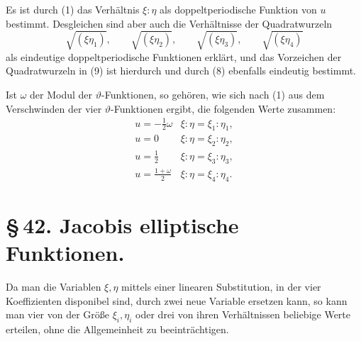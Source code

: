 \documentclass[11pt]{article}
\begin{document}
Es ist durch (1) das Verhältnis $\xi:\eta$ als doppeltperiodische Funktion von $u$ bestimmt. Desgleichen sind aber auch die Verhältnisse der Quadratwurzeln
\begin{equation}
\sqrt{(\xi\eta_1)},\qquad \sqrt{(\xi\eta_2)},\qquad
\sqrt{(\xi\eta_3)},\qquad \sqrt{(\xi\eta_4)}
\tag{10}
\end{equation}
als eindeutige doppeltperiodische Funktionen erklärt, und das Vorzeichen der Quadratwurzeln in (9) ist hierdurch und durch (8) ebenfalls eindeutig bestimmt.

Ist $\omega$ der Modul der $\vartheta$-Funktionen, so gehören, wie sich nach (1) aus dem Verschwinden der vier $\vartheta$-Funktionen ergibt, die folgenden Werte zusammen:
\begin{equation}
\begin{array}{c|c}
 u=-\frac12\omega & \xi:\eta=\xi_1:\eta_1,\\[0.35em]
 u=0 & \xi:\eta=\xi_2:\eta_2,\\[0.35em]
 u=\frac12 & \xi:\eta=\xi_3:\eta_3,\\[0.35em]
 u=\frac{1+\omega}{2} & \xi:\eta=\xi_4:\eta_4.
\end{array}
\tag{11}
\end{equation}

\section*{\S\,42. Jacobis elliptische Funktionen.}

Da man die Variablen $\xi,\eta$ mittels einer linearen Substitution, in der vier Koeffizienten disponibel sind, durch zwei neue Variable ersetzen kann, so kann man vier von der Größe $\xi_i,\eta_i$ oder drei von ihren Verhältnissen beliebige Werte erteilen, ohne die Allgemeinheit zu beeinträchtigen.
\end{document}
